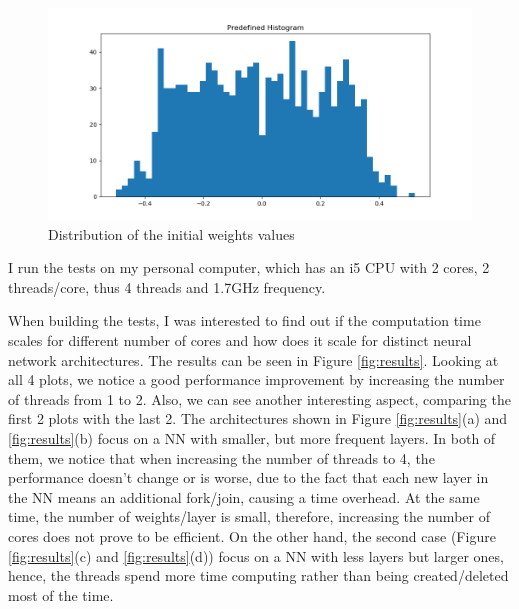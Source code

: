 \documentclass{article}
\begin{document}
	\begin{figure}[htbp]
		\centering
		\includegraphics[scale=0.6]{fig/weights_1.png}
		\caption{Distribution of the initial weights values}
		\label{fig:normal}
	\end{figure}
	
	I run the tests on my personal computer, which has an i5 CPU with 2 cores, 2 threads/core, thus 4 threads and 1.7GHz frequency.
	
	When building the tests, I was interested to find out if the computation time scales for different number of cores and how does it scale for distinct neural network architectures.
	The results can be seen in Figure \ref{fig:results}. Looking at all 4 plots, we notice a good performance improvement by increasing the number of threads from 1 to 2.
	Also, we can see another interesting aspect, comparing the first 2 plots with the last 2. The architectures shown in Figure \ref{fig:results}(a) and \ref{fig:results}(b) focus on a NN with smaller, but more frequent layers. In both of them, we notice that when increasing the number of threads to 4, the performance doesn't change or is worse, due to the fact that each new layer in the NN means an additional fork/join, causing a time overhead. At the same time, the number of weights/layer is small, therefore, increasing the number of cores does not prove to be efficient.
	On the other hand, the second case (Figure \ref{fig:results}(c) and \ref{fig:results}(d)) focus on a NN with less layers but larger ones, hence, the threads spend more time computing rather than being created/deleted most of the time.
	
\end{document}
